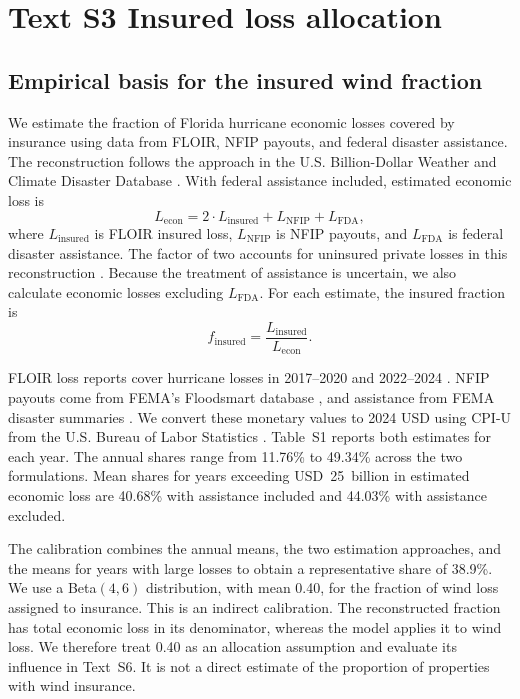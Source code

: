\section*{Text S3 Insured loss allocation}\label{TextS3}
\subsection*{Empirical basis for the insured wind fraction}
We estimate the fraction of Florida hurricane economic losses covered by insurance using data from FLOIR, NFIP payouts, and federal disaster assistance. The reconstruction follows the approach in the U.S. Billion-Dollar Weather and Climate Disaster Database \cite{smith_us_2013,smith_quantifying_2015}. With federal assistance included, estimated economic loss is
\begin{equation}
L_{\text{econ}} = 2 \cdot L_{\text{insured}} + L_{\text{NFIP}} + L_{\text{FDA}},
\label{eq:economicreconstruction}
\end{equation}
where $L_{\text{insured}}$ is FLOIR insured loss, $L_{\text{NFIP}}$ is NFIP payouts, and $L_{\text{FDA}}$ is federal disaster assistance. The factor of two accounts for uninsured private losses in this reconstruction \cite{smith_us_2013}. Because the treatment of assistance is uncertain, we also calculate economic losses excluding $L_{\text{FDA}}$. For each estimate, the insured fraction is
\begin{equation}
f_{\text{insured}} = \frac{L_{\text{insured}}}{L_{\text{econ}}}.
\label{eq:insuredcalibration}
\end{equation}

FLOIR loss reports cover hurricane losses in 2017--2020 and 2022--2024 \cite{floir_catastrophe_2026}. NFIP payouts come from FEMA's Floodsmart database \cite{nfip_historical_2026}, and assistance from FEMA disaster summaries \cite{fema_declarations_2026}. We convert these monetary values to 2024 USD using CPI-U from the U.S. Bureau of Labor Statistics \cite{bls_cpi_2026}. Table~S1 reports both estimates for each year. The annual shares range from 11.76\% to 49.34\% across the two formulations. Mean shares for years exceeding USD~25~billion in estimated economic loss are 40.68\% with assistance included and 44.03\% with assistance excluded.

The calibration combines the annual means, the two estimation approaches, and the means for years with large losses to obtain a representative share of 38.9\%. We use a Beta$(4,6)$ distribution, with mean 0.40, for the fraction of wind loss assigned to insurance. This is an indirect calibration. The reconstructed fraction has total economic loss in its denominator, whereas the model applies it to wind loss. We therefore treat 0.40 as an allocation assumption and evaluate its influence in Text~S6. It is not a direct estimate of the proportion of properties with wind insurance.

